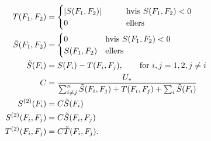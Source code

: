 \documentclass[a4paper, 12pt]{memoir}
\begin{document}
\begin{enumerate}[(i)]
\begin{align}
T(F_1,F_2)&=\begin{cases}|S(F_1,F_2)| \qquad &\textup{hvis } S(F_1,F_2)<0\\
0 &\textup{ellers}
\end{cases}\\
\tilde S(F_1,F_2)&=\begin{cases}0 \qquad &\textup{hvis } S(F_1,F_2)<0\\
S(F_1,F_2) &\textup{ellers}
\end{cases}\\
\tilde S(F_i)&= S(F_i)-T(F_i, F_{j}), \qquad \textup{for } i,j=1,2, j\neq i\label{marginalizing}\\
C&=\frac{U_*}{\sum_{i\neq j}^n \tilde S(F_i,F_j)+T(F_i,F_j)+\sum_i \tilde S(F_i)}\\
S^{(2)}(F_i)&=C\tilde S(F_i)\\
S^{(2)}(F_i,F_j)&=C\tilde S(F_i,F_j)\\
T^{(2)}(F_i,F_j)&=C\tilde T(F_i,F_j).
\end{align}



\end{enumerate}
\end{document}

